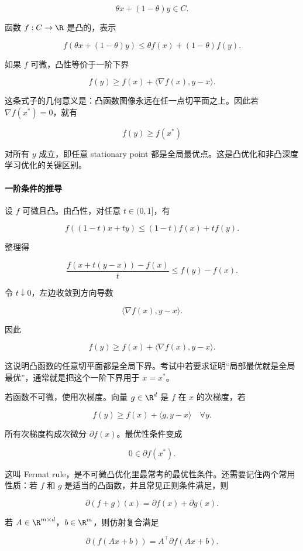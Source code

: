 \[
  \theta x+(1-\theta)y\in C.
\]

函数 \(f:C\to\R\) 是凸的，表示

\[
  f(\theta x+(1-\theta)y)
  \le
  \theta f(x)+(1-\theta)f(y).
\]

如果 \(f\) 可微，凸性等价于一阶下界

\[
  f(y)\ge f(x)+\langle \nabla f(x),y-x\rangle.
\]

这条式子的几何意义是：凸函数图像永远在任一点切平面之上。因此若 \(\nabla f(x^*)=0\)，就有

\[
  f(y)\ge f(x^*)
\]

对所有 \(y\) 成立，即任意 stationary point 都是全局最优点。这是凸优化和非凸深度学习优化的关键区别。

\paragraph{一阶条件的推导}

设 \(f\) 可微且凸。由凸性，对任意 \(t\in(0,1]\)，有

\[
  f((1-t)x+ty)
  \le
  (1-t)f(x)+tf(y).
\]

整理得

\[
  \frac{f(x+t(y-x))-f(x)}{t}
  \le
  f(y)-f(x).
\]

令 \(t\downarrow0\)，左边收敛到方向导数

\[
  \langle\nabla f(x),y-x\rangle.
\]

因此

\[
  f(y)\ge f(x)+\langle\nabla f(x),y-x\rangle.
\]

这说明凸函数的任意切平面都是全局下界。考试中若要求证明“局部最优就是全局最优”，通常就是把这个一阶下界用于 \(x=x^*\)。

若函数不可微，使用次梯度。向量 \(g\in\R^d\) 是 \(f\) 在 \(x\) 的次梯度，若

\[
  f(y)\ge f(x)+\langle g,y-x\rangle
  \quad
  \forall y.
\]

所有次梯度构成次微分 \(\partial f(x)\)。最优性条件变成

\[
  0\in \partial f(x^*).
\]

这叫 Fermat rule，是不可微凸优化里最常考的最优性条件。还需要记住两个常用性质：若 \(f\) 和 \(g\) 是适当的凸函数，并且常见正则条件满足，则

\[
  \partial(f+g)(x)
  =
  \partial f(x)+\partial g(x).
\]

若 \(A\in\R^{m\times d}\)，\(b\in\R^m\)，则仿射复合满足

\[
  \partial (f(Ax+b))
  =
  A^\top \partial f(Ax+b).
\]


